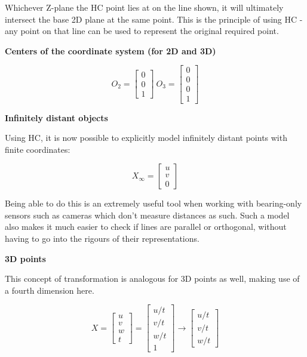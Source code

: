 \documentclass[a4paper]{article}
\begin{document}
Whichever Z-plane the HC point lies at on the line shown, it will ultimately intersect the base 2D plane at the same point. This is the principle of using HC - any point on that line can be used to represent the original required point.

\textbf{Centers of the coordinate system (for 2D and 3D)}

\begin{equation*}
O_2 =
\begin{bmatrix}
0\\0\\1
\end{bmatrix}
\: O_3 = 
\begin{bmatrix}
0\\0\\0\\1
\end{bmatrix}
\end{equation*}

\textbf{Infinitely distant objects}

Using HC, it is now possible to explicitly model infinitely distant points with finite coordinates:

\begin{equation*}
X_{\infty} =
\begin{bmatrix}
u \\ v \\ 0
\end{bmatrix}
\end{equation*}

Being able to do this is an extremely useful tool when working with bearing-only sensors such as cameras which don't measure distances as such. Such a model also makes it much easier to check if lines are parallel or orthogonal, without having to go into the rigours of their representations.

\textbf{3D points}

This concept of transformation is analogous for 3D points as well, making use of a fourth dimension here.

\begin{equation*}
X = 
\begin{bmatrix}
u\\v\\w\\t
\end{bmatrix}
=
\begin{bmatrix}
u/t\\v/t\\w/t\\1
\end{bmatrix}
\longrightarrow
\begin{bmatrix}
u/t\\v/t\\w/t
\end{bmatrix}
\end{equation*}
\end{document}
